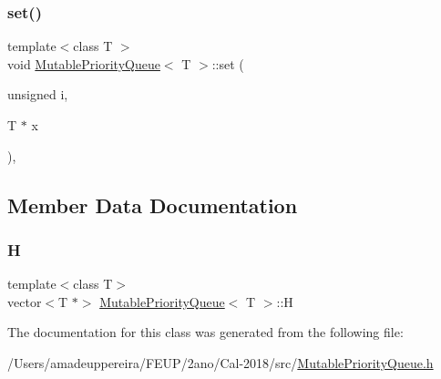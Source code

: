 \mbox{\label{class_mutable_priority_queue_afbe461c0a2ea2f16006ed7e1bf9c105d}} 
\subsubsection{\texorpdfstring{set()}{set()}}
{\footnotesize\ttfamily template$<$class T $>$ \\
void \mbox{\hyperlink{class_mutable_priority_queue}{Mutable\+Priority\+Queue}}$<$ T $>$\+::set (\begin{DoxyParamCaption}\item[{unsigned}]{i,  }\item[{T $\ast$}]{x }\end{DoxyParamCaption})\hspace{0.3cm}{\ttfamily [inline]}, {\ttfamily [private]}}



\subsection{Member Data Documentation}
\mbox{\label{class_mutable_priority_queue_a2c442cb8e2ff5cfa7562174dadc83fe7}} 
\subsubsection{\texorpdfstring{H}{H}}
{\footnotesize\ttfamily template$<$class T$>$ \\
vector$<$T $\ast$$>$ \mbox{\hyperlink{class_mutable_priority_queue}{Mutable\+Priority\+Queue}}$<$ T $>$\+::H\hspace{0.3cm}{\ttfamily [private]}}



The documentation for this class was generated from the following file\+:\begin{DoxyCompactItemize}
\item 
/\+Users/amadeuppereira/\+F\+E\+U\+P/2ano/\+Cal-\/2018/src/\mbox{\hyperlink{_mutable_priority_queue_8h}{Mutable\+Priority\+Queue.\+h}}\end{DoxyCompactItemize}

